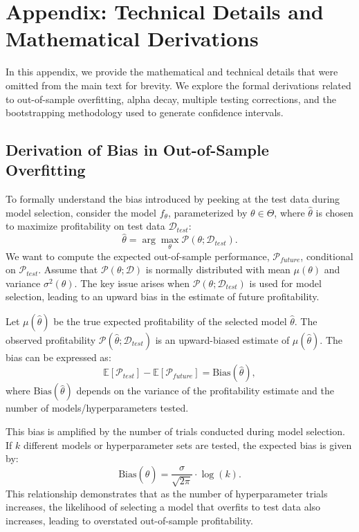 \appendix

\section{Appendix: Technical Details and Mathematical Derivations}

In this appendix, we provide the mathematical and technical details that were omitted from the main text for brevity. We explore the formal derivations related to out-of-sample overfitting, alpha decay, multiple testing corrections, and the bootstrapping methodology used to generate confidence intervals.

\subsection{Derivation of Bias in Out-of-Sample Overfitting}

To formally understand the bias introduced by peeking at the test data during model selection, consider the model $f_{\theta}$, parameterized by $\theta \in \Theta$, where $\hat{\theta}$ is chosen to maximize profitability on test data $\mathcal{D}_{test}$:
\[
\hat{\theta} = \arg \max_{\theta} \mathcal{P}(\theta; \mathcal{D}_{test}).
\]
We want to compute the expected out-of-sample performance, $\mathcal{P}_{future}$, conditional on $\mathcal{P}_{test}$. Assume that $\mathcal{P}(\theta; \mathcal{D})$ is normally distributed with mean $\mu(\theta)$ and variance $\sigma^2(\theta)$. The key issue arises when $\mathcal{P}(\theta; \mathcal{D}_{test})$ is used for model selection, leading to an upward bias in the estimate of future profitability.

Let $\mu(\hat{\theta})$ be the true expected profitability of the selected model $\hat{\theta}$. The observed profitability $\mathcal{P}(\hat{\theta}; \mathcal{D}_{test})$ is an upward-biased estimate of $\mu(\hat{\theta})$. The bias can be expressed as:
\[
\mathbb{E}[\mathcal{P}_{test}] - \mathbb{E}[\mathcal{P}_{future}] = \text{Bias}(\hat{\theta}),
\]
where $\text{Bias}(\hat{\theta})$ depends on the variance of the profitability estimate and the number of models/hyperparameters tested.

This bias is amplified by the number of trials conducted during model selection. If $k$ different models or hyperparameter sets are tested, the expected bias is given by:
\[
\text{Bias}(\hat{\theta}) = \frac{\sigma}{\sqrt{2\pi}} \cdot \log(k).
\]
This relationship demonstrates that as the number of hyperparameter trials increases, the likelihood of selecting a model that overfits to test data also increases, leading to overstated out-of-sample profitability.

